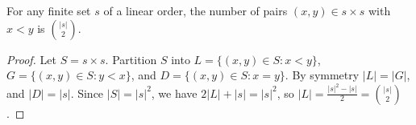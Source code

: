 \begin{helper}
For any finite set $s$ of a linear order, the number of pairs $(x, y) \in s \times s$ with $x < y$ is $\binom{|s|}{2}$.
\end{helper}
\begin{proof}
Let $S = s \times s$. Partition $S$ into $L = \{(x, y) \in S : x < y\}$, $G = \{(x, y) \in S : y < x\}$, and $D = \{(x, y) \in S : x = y\}$.
By symmetry $|L| = |G|$, and $|D| = |s|$. Since $|S| = |s|^2$, we have $2|L| + |s| = |s|^2$, so $|L| = \frac{|s|^2 - |s|}{2} = \binom{|s|}{2}$.
\end{proof}
